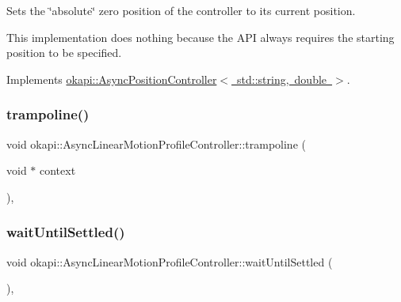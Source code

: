 Sets the \char`\"{}absolute\char`\"{} zero position of the controller to its current position.

This implementation does nothing because the A\+PI always requires the starting position to be specified. 

Implements \mbox{\hyperlink{classokapi_1_1AsyncPositionController_a0af03d0035343cbf843a19374f38a059}{okapi\+::\+Async\+Position\+Controller$<$ std\+::string, double $>$}}.

\mbox{\label{classokapi_1_1AsyncLinearMotionProfileController_a9b49662a9d4107ebe1b4799934e472a3}} 
\subsubsection{\texorpdfstring{trampoline()}{trampoline()}}
{\footnotesize\ttfamily void okapi\+::\+Async\+Linear\+Motion\+Profile\+Controller\+::trampoline (\begin{DoxyParamCaption}\item[{void $\ast$}]{context }\end{DoxyParamCaption})\hspace{0.3cm}{\ttfamily [static]}, {\ttfamily [protected]}}

\mbox{\label{classokapi_1_1AsyncLinearMotionProfileController_ad2609e435baad67b73b86b48730fdc9c}} 
\subsubsection{\texorpdfstring{waitUntilSettled()}{waitUntilSettled()}}
{\footnotesize\ttfamily void okapi\+::\+Async\+Linear\+Motion\+Profile\+Controller\+::wait\+Until\+Settled (\begin{DoxyParamCaption}{ }\end{DoxyParamCaption})\hspace{0.3cm}{\ttfamily [override]}, {\ttfamily [virtual]}}

